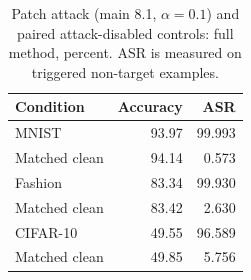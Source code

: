 \begin{table}[!t]
\centering\footnotesize
\caption{Patch attack (main 8.1, $\alpha=0.1$) and paired attack-disabled controls: full method, percent. ASR is measured on triggered non-target examples.}\label{tab:backdoor}
\begin{tabular}{lrr}
\toprule
Condition & Accuracy & ASR \\
\midrule
MNIST & 93.97 & 99.993 \\
Matched clean & 94.14 & 0.573 \\
Fashion & 83.34 & 99.930 \\
Matched clean & 83.42 & 2.630 \\
CIFAR-10 & 49.55 & 96.589 \\
Matched clean & 49.85 & 5.756 \\
\bottomrule
\end{tabular}
\end{table}

